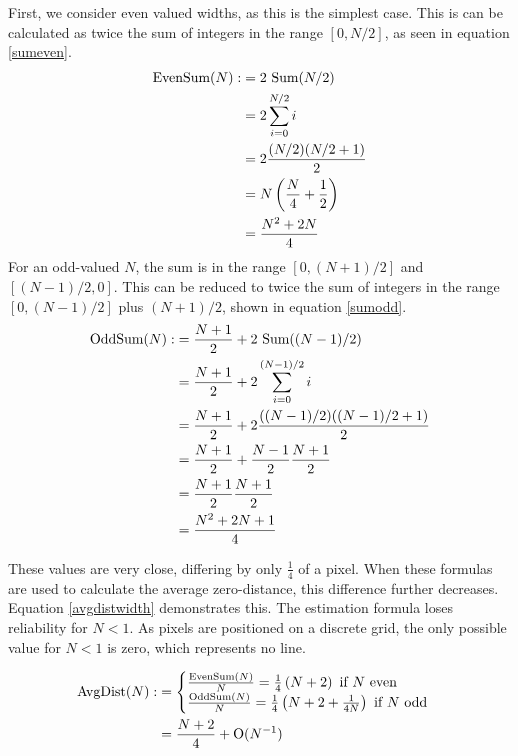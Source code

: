 \documentclass[../main.tex]{subfiles}
\begin{document}
    First, we consider even valued widths, as this is the simplest case.
    This is can be calculated as twice the sum of integers in the range $[0,N/2]$, as seen in equation \ref{sumeven}.
    \begin{align}
      \text{EvenSum}(N):&=2\text{ Sum}(N/2)\notag\\
                        &=2\sum_{i=0}^{N/2}i\notag\\
                        &=2\frac{(N/2)(N/2+1)}{2}\notag\\
                        &=N\left(\frac{N}{4}+\frac{1}{2}\right)\notag\\
                        &=\frac{N^2+2N}{4}\
      \label{sumeven}
    \end{align}
    For an odd-valued $N$, the sum is in the range $[0,(N+1)/2]$ and $[(N-1)/2,0]$.
    This can be reduced to twice the sum of integers in the range $[0,(N-1)/2]$ plus $(N+1)/2$, shown in equation \ref{sumodd}.
    \begin{align}
      \text{OddSum}(N):&=\frac{N+1}{2}+2\text{ Sum}((N-1)/2)\notag\\
                        &=\frac{N+1}{2}+2\sum_{i=0}^{(N-1)/2}i\notag\\
                        &=\frac{N+1}{2}+2\frac{((N-1)/2)((N-1)/2+1)}{2}\notag\\
                        &=\frac{N+1}{2}+\frac{N-1}{2}\frac{N+1}{2}\notag\\
                        &=\frac{N+1}{2}\frac{N+1}{2}\notag\\
                        &=\frac{N^2+2N+1}{4}
      \label{sumodd}
    \end{align}

    These values are very close, differing by only $\frac{1}{4}$ of a pixel.
    When these formulas are used to calculate the average zero-distance, this difference further decreases.
    Equation \ref{avgdistwidth} demonstrates this.
    The estimation formula loses reliability for $N<1$. 
    As pixels are positioned on a discrete grid, the only possible value for $N<1$ is zero, which represents no line.

    \begin{align}
     \text{AvgDist}(N) :&=
        \begin{cases}
          \frac{\text{EvenSum}(N)}{N} =\frac{1}{4}\left(N+2\right) \text{ if } N \text{ even}\\
          \frac{\text{OddSum}(N)}{N} =\frac{1}{4}\left(N+2+\frac{1}{4N}\right) \text{ if } N \text{ odd}
        \end{cases}\notag\\
      &= \frac{N+2}{4} + \text{O}(N^{-1})
      \label{avgdistwidth}
    \end{align}
\end{document}
